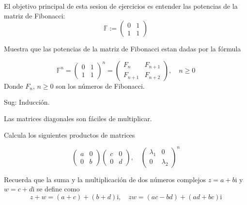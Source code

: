 El objetivo principal de esta sesion de ejercicios es entender las potencias de la matriz de Fibonacci:
$$\mathbb F:=\left(\begin{array}{cc}
0&1 \\
1&1 
\end{array}\right)$$
\begin{ejercicio}
Muestra que las potencias de la matriz de Fibonacci estan dadas por la fórmula

$$\mathbb F^n=\left(\begin{array}{cc}
0&1 \\
1&1 
\end{array}\right)^n
=
\left(\begin{array}{cc}
F_n&F_{n+1} \\
F_{n+1}&F_{n+2} 
\end{array}\right),
\quad
n\geq 0
$$
Donde $F_n$, $n\geq 0$ son los números de Fibonacci.

Sug: Inducción.
\end{ejercicio}

Las matrices diagonales son fáciles de multiplicar.

\begin{ejercicio}
Calcula los siguientes productos de matrices

$$\left(\begin{array}{cc}
a&0 \\
0&b 
\end{array}\right)
\left(\begin{array}{cc}
c&0 \\
0&d 
\end{array}\right)
,\quad
\left(\begin{array}{cc}
\lambda_1&0 \\
0&\lambda_2 
\end{array}\right)^n$$
\end{ejercicio}

Recuerda que la suma y la multiplicación de dos números complejos $z=a+b\mathrm i$ y $w=c+d\mathrm i$ se define como $$z+w=(a+c)+(b+d)\mathrm i, \quad z w=(ac-bd)+(ad+bc)\mathrm i$$

